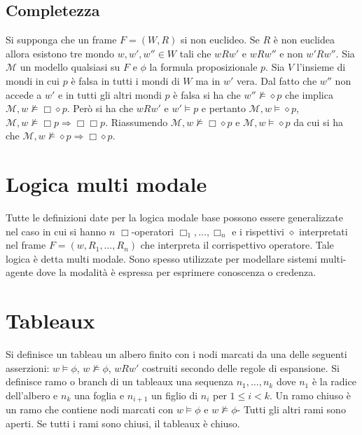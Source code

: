 \subsection{Completezza}
Si supponga che un frame $F=(W,R)$ si non euclideo. Se $R$ \`e non euclidea allora esistono tre mondo $w, w',w''\in W$ tali che $wRw'$ e $wRw''$ e non $w'Rw''$. Sia $\mathcal{M}$ un modello qualsiasi
su $F$ e $\phi$ la formula proposizionale $p$. Sia $V$ l'insieme di mondi in cui $p$ \`e falsa in tutti i mondi di $W$ ma in $w'$ vera. Dal fatto che $w''$ non accede a $w'$ e in tutti gli altri mondi $p$ \`e 
falsa si ha che $w''\not\models\diamond p$ che implica $\mathcal{M}, w\not\models\Box\diamond p$. Per\`o si ha che $wRw'$ e $w'\models p$ e pertanto $\mathcal{M}, w\models \diamond p$, 
$\mathcal{M}, w\not\models\Box p\Rightarrow\Box\Box p$. Riassumendo $\mathcal{M}, w\not\models\Box\diamond p$ e $\mathcal{M}, w\models\diamond p$ da cui si ha che $\mathcal{M}, w\not\models
\diamond p\Rightarrow\Box\diamond p$.
\section{Logica multi modale}
Tutte le definizioni date per la logica modale base possono essere generalizzate nel caso in cui si hanno $n$ $\Box$-operatori $\Box_1,\dots, \Box_n$ e i rispettivi $\diamond$ interpretati nel frame $F=(w, 
R_1, \dots, R_n)$ che interpreta il corrispettivo operatore.  Tale logica \`e detta multi modale. Sono spesso utilizzate per modellare sistemi multi-agente dove la modalit\`a \`e espressa per esprimere 
conoscenza o credenza.
\section{Tableaux}
Si definisce un tableau un albero finito con i nodi marcati da una delle seguenti asserzioni: $w\models\phi$, $w\not\models\phi$, $wRw'$ costruiti secondo delle regole di espansione. Si definisce ramo o 
branch di un tableaux una sequenza $n_1,\dots, n_k$ dove $n_1$ \`e la radice dell'albero e $n_k$ una foglia e $n_{i+1}$ un figlio di $n_i$ per $1\le i<k$. Un ramo chiuso \`e un ramo che contiene nodi 
marcati con $w\models\phi$ e $w\not\models\phi$- Tutti gli altri rami sono aperti. Se tutti i rami sono chiusi, il tableaux \`e chiuso.

